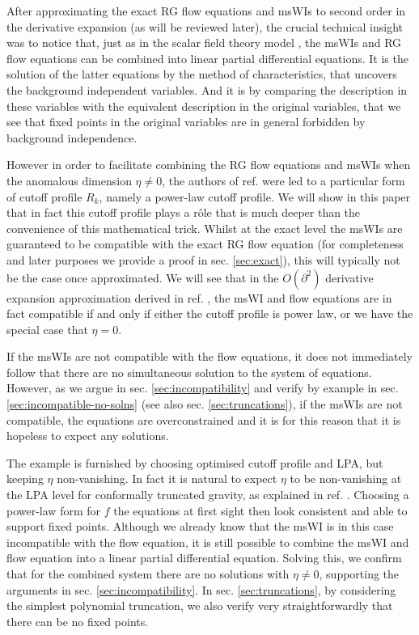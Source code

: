 \documentclass[11pt]{book} %
\numberwithin{equation}{chapter}
\begin{document}
After approximating the exact RG flow equations and msWIs to second order in the derivative
expansion (as will be reviewed later),
the crucial technical insight was to notice that, just as in the scalar field theory model
\cite{Bridle:2013sra}, the msWIs and RG flow equations can be combined into linear partial
differential equations. It is the solution of the latter equations by the method of characteristics,
that uncovers the background independent variables.
And it is by comparing the description in these variables with the equivalent description
in the original variables, that we see that fixed points in the original variables are
in general forbidden by  background independence.

However in order to facilitate combining the RG flow equations and msWIs when the anomalous
dimension $\eta\ne0$, the authors of ref. \cite{Dietz:2015owa} were led to a particular form
of cutoff profile $R_k$, namely a power-law cutoff profile.
We will show in this paper that in fact this cutoff profile plays a r\^ole that is much
deeper than the convenience of this mathematical trick.
Whilst at the exact level the msWIs are guaranteed to be compatible with the exact RG
flow equation (for completeness and later purposes we provide a proof in sec. \ref{sec:exact}),
this will typically not be the case once approximated.
We will see that in the $O(\partial^2)$ derivative expansion approximation derived
in ref. \cite{Dietz:2015owa},
the msWI and flow equations are in fact compatible {if and only if} either the cutoff profile
is power law, or we have the special case that $\eta=0$.

If the msWIs are not compatible with the flow equations,
it does not immediately follow that there are no simultaneous solution to the system of equations.
However, as we argue in sec. \ref{sec:incompatibility} and verify by example in
sec. \ref{sec:incompatible-no-solns} (see also sec. \ref{sec:truncations}),
if the msWIs are not compatible, the equations are overconstrained and it is for this reason that
it is hopeless to expect any solutions.

The example is furnished by choosing optimised cutoff profile and LPA, but keeping $\eta$ non-vanishing.
In fact it is natural to expect $\eta$ to be non-vanishing at the LPA level for conformally truncated gravity,
as explained in ref. \cite{Dietz:2016gzg}.
Choosing a power-law form for $f$ the equations at first sight then look consistent and able
to support fixed points. Although we already know that the msWI is in this case incompatible with the
flow equation, it is still possible to combine the msWI and flow equation into a linear partial
differential equation. Solving this, we confirm that for the combined system there are no solutions
with $\eta\ne0$, supporting the arguments in sec. \ref{sec:incompatibility}.
In sec. \ref{sec:truncations}, by considering the simplest polynomial truncation,
we also verify very straightforwardly that there can be no fixed points.
\end{document}
